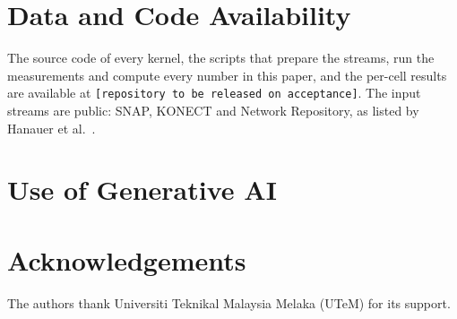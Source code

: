 \documentclass{jgaa-art}
\begin{document}
\begin{abstract}
We study exact sequential counting of triangles, 4-cycles and 5-cycles in a graph that receives insertions and deletions in batches.
We ask whether sharing work between the updates of one batch beats the strongest kernels that do not share.
The sharing kernel groups a batch into stars and builds one row of path counts at the centre of each star, which every update of the star reuses.
It is compared with a per-update scan, wedge tables, a heavy-light mixed table, an affected-subgraph recount and, for 4-cycles, a published batch algorithm. Every count is checked to be exact, and every cost of upkeep is included in the measured time.
A cell is one stream, batch size and pattern, and it passes when the slowest repeat of the sharing kernel takes at most 0.67 times the fastest repeat of the best other kernel.
On 16 real-timestamp streams, six with recorded deletions, sharing passes on 28 of 50 cells for 5-cycles, on none of 48 for triangles, and on none of 12 for 4-cycles, which were timed on three streams.
It fails on the one stream held out until the end, and with a scan 10\% faster only 16 of the 50 cells would pass.
On most cells, the kernel with the fewest operations is not the fastest.
A linear model that prices each kind of operation, fitted on three small streams, names the fastest kernel on 63 of 64 cells of twelve unseen streams, against 21 for a single price per operation.
All timing is from one machine.
\end{abstract}

\linenumbers








\section*{Data and Code Availability}
The source code of every kernel, the scripts that prepare the streams, run the measurements and compute every number in this paper, and the per-cell results are available at \texttt{[repository to be released on acceptance]}.
The input streams are public: SNAP, KONECT and Network Repository, as listed by Hanauer et al.~\cite{hanauer-dyncount}.

\section*{Use of Generative AI}


\section*{Acknowledgements}
The authors thank Universiti Teknikal Malaysia Melaka (UTeM) for its support.




\clearpage
\appendix

\end{document}
